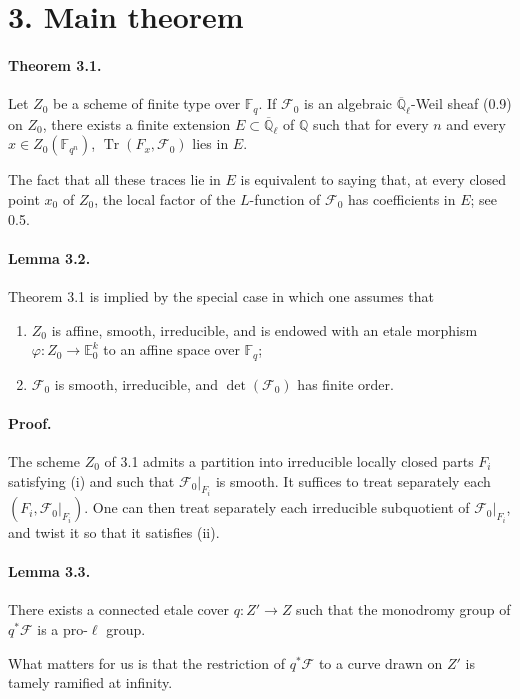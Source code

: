 \documentclass[11pt]{article}
\newcommand{\F}{\mathbb{F}}
\newcommand{\Q}{\mathbb{Q}}
\newcommand{\Ql}{\overline{\mathbb Q}_{\ell}}
\newcommand{\Tr}{\operatorname{Tr}}
\begin{document}
\section*{3. Main theorem}

\paragraph{Theorem 3.1.}
Let $Z_0$ be a scheme of finite type over $\F_q$.
If $\mathcal F_0$ is an algebraic $\Ql$-Weil sheaf (0.9) on $Z_0$, there exists a finite extension $E\subset\Ql$ of $\Q$ such that for every $n$ and every $x\in Z_0(\F_{q^n})$, $\Tr(F_x,\mathcal F_0)$ lies in $E$.

The fact that all these traces lie in $E$ is equivalent to saying that, at every closed point $x_0$ of $Z_0$, the local factor of the $L$-function of $\mathcal F_0$ has coefficients in $E$; see 0.5.

\paragraph{Lemma 3.2.}
Theorem 3.1 is implied by the special case in which one assumes that
\begin{enumerate}[label=(\roman*)]
\item $Z_0$ is affine, smooth, irreducible, and is endowed with an etale morphism $\varphi:Z_0\to\mathbb E^k_0$ to an affine space over $\F_q$;
\item $\mathcal F_0$ is smooth, irreducible, and $\det(\mathcal F_0)$ has finite order.
\end{enumerate}

\paragraph{Proof.}
The scheme $Z_0$ of 3.1 admits a partition into irreducible locally closed parts $F_i$ satisfying (i) and such that $\mathcal F_0|_{F_i}$ is smooth.
It suffices to treat separately each $(F_i,\mathcal F_0|_{F_i})$.
One can then treat separately each irreducible subquotient of $\mathcal F_0|_{F_i}$, and twist it so that it satisfies (ii).

\paragraph{Lemma 3.3.}
There exists a connected etale cover $q:Z'\to Z$ such that the monodromy group of $q^*\mathcal F$ is a pro-$\ell$ group.

What matters for us is that the restriction of $q^*\mathcal F$ to a curve drawn on $Z'$ is tamely ramified at infinity.
\end{document}
